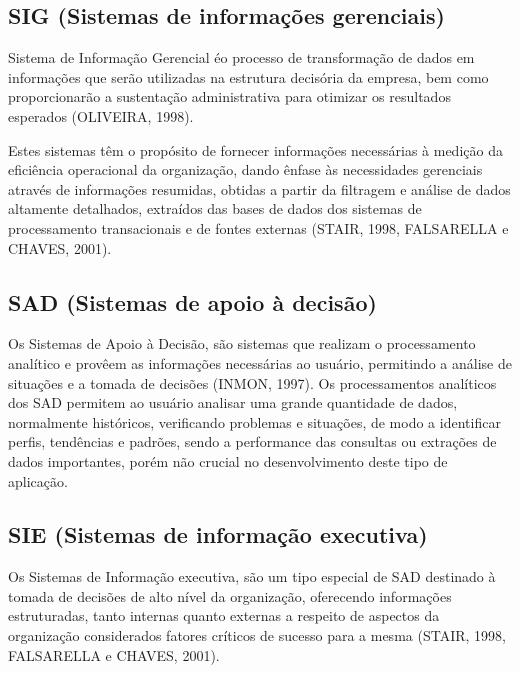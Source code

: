 \subsection{SIG (Sistemas de informações gerenciais)}

Sistema de Informação Gerencial \'{e}o processo de transformação de dados em informações que serão utilizadas na estrutura decisória da empresa, bem como proporcionarão a sustentação administrativa para otimizar os resultados esperados (OLIVEIRA, 1998).

\begin{flushleft}
	Estes sistemas têm o propósito de fornecer informações necessárias à medição da eficiência operacional da organização, dando ênfase às necessidades gerenciais através de informações resumidas, obtidas a partir da filtragem e análise de dados altamente detalhados, extraídos das bases de dados dos sistemas de processamento transacionais e de fontes externas (STAIR, 1998, FALSARELLA e CHAVES, 2001).
\end{flushleft}

\subsection{SAD (Sistemas de apoio à decisão)}

Os Sistemas de Apoio à Decisão, são sistemas que realizam o processamento analítico e provêem as informações necessárias ao usuário, permitindo a análise de situações e a tomada de decisões (INMON, 1997).
Os processamentos analíticos dos SAD permitem ao usuário analisar uma grande quantidade de dados, normalmente históricos, verificando problemas e situações, de modo a identificar perfis, tendências e padrões, sendo a performance das consultas ou extrações de dados importantes, porém não crucial no desenvolvimento deste tipo de aplicação.

\subsection{SIE (Sistemas de informação executiva)}

Os Sistemas de Informação executiva, são um tipo especial de SAD destinado à tomada de decisões de alto nível da organização, oferecendo informações estruturadas, tanto internas quanto externas a respeito de aspectos da organização considerados fatores críticos de sucesso para a mesma (STAIR, 1998, FALSARELLA e CHAVES, 2001).

